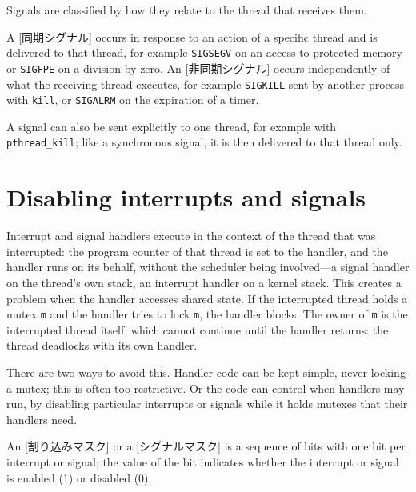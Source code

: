 \documentclass[../main.tex]{subfiles}
\begin{document}
Signals are classified by how they relate to the thread that receives
them.

\begin{definition}
  A [同期シグナル] occurs in response to an
  action of a specific thread and is delivered to that thread, for example
  \texttt{SIGSEGV} on an access to protected memory or \texttt{SIGFPE} on a
  division by zero.  An
  [非同期シグナル] occurs independently of what
  the receiving thread executes, for example \texttt{SIGKILL} sent by
  another process with \texttt{kill}, or \texttt{SIGALRM} on the
  expiration of a timer.
\end{definition}

A signal can also be sent explicitly to one thread, for example with
\texttt{pthread\_kill}; like a synchronous signal, it is then delivered to
that thread only.

\section{Disabling interrupts and signals}
\label{sec:l05-masks}

Interrupt and signal handlers execute in the context of the thread that
was interrupted: the program counter of that thread is set to the handler,
and the handler runs on its behalf, without the scheduler being
involved---a signal handler on the thread's own stack, an interrupt
handler on a kernel stack.  This creates a problem
when the handler accesses shared state.  If the interrupted thread holds a
mutex \texttt{m} and the handler tries to lock \texttt{m}, the handler
blocks.  The owner of \texttt{m} is the interrupted thread itself, which
cannot continue until the handler returns: the thread deadlocks with its
own handler.

There are two ways to avoid this.  Handler code can be kept simple, never
locking a mutex; this is often too restrictive.  Or the code can control
when handlers may run, by disabling particular interrupts or signals while
it holds mutexes that their handlers need.

\begin{definition}
  An [割り込みマスク] or a
  [シグナルマスク] is a sequence of bits with one bit per
  interrupt or signal; the value of the bit indicates whether the interrupt
  or signal is enabled (1) or disabled (0).
\end{definition}
\end{document}
